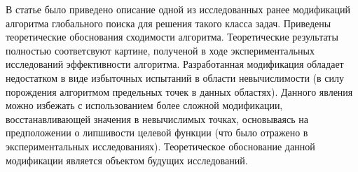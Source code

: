 \documentclass[10pt,a4paper]{book}
\begin{document}
В статье было приведено описание одной из исследованных ранее модификаций алгоритма глобального поиска для решения такого класса задач. Приведены теоретические обоснования сходимости алгоритма. Теоретические результаты полностью соответсвуют картине, полученой в ходе экспериментальных исследований эффективности алгоритма. Разработанная модификация обладает недостатком в виде избыточных испытаний в области невычислимости (в силу порождения алгоритмом предельных точек в данных областях). Данного явления можно избежать с использованием более сложной модификации, восстанавливающей значения в невычислимых точках, основываясь на предположении о липшивости целевой функции (что было отражено в экспериментальных исследованиях). Теоретическое обоснование данной модификации является объектом будущих исследований.

%
%
\LITERRUS
\end{document}

